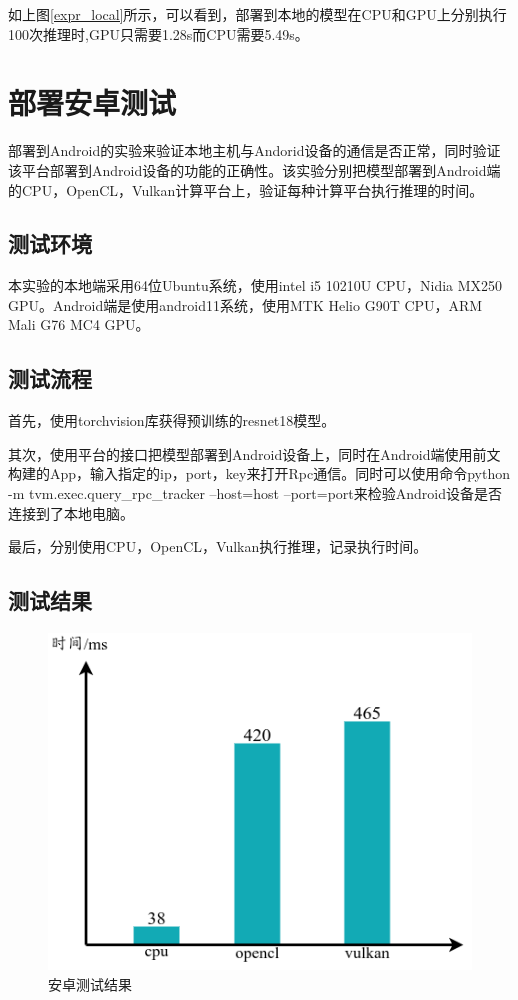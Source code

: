 如上图\ref{expr_local}所示，可以看到，部署到本地的模型在CPU和GPU上分别执行100次推理时,GPU只需要1.28s而CPU需要5.49s。


\section{部署安卓测试}

部署到Android的实验来验证本地主机与Andorid设备的通信是否正常，同时验证该平台部署到Android设备的功能的正确性。该实验分别把模型部署到Android端的CPU，OpenCL，Vulkan计算平台上，验证每种计算平台执行推理的时间。

\subsection{测试环境}

本实验的本地端采用64位Ubuntu系统，使用intel i5 10210U CPU，Nidia MX250 GPU。Android端是使用android11系统，使用MTK Helio G90T CPU，ARM Mali G76 MC4 GPU。


\subsection{测试流程}

首先，使用torchvision库获得预训练的resnet18模型。

其次，使用平台的接口把模型部署到Android设备上，同时在Android端使用前文构建的App，输入指定的ip，port，key来打开Rpc通信。同时可以使用命令python -m tvm.exec.query\_rpc\_tracker --host=host --port=port来检验Android设备是否连接到了本地电脑。

最后，分别使用CPU，OpenCL，Vulkan执行推理，记录执行时间。


\subsection{测试结果}

\begin{figure}[h!]
    \centering
    \includegraphics[width=180bp]{figure/expr_android.png}
    \caption{安卓测试结果}
    \label{expr_android}
\end{figure}

